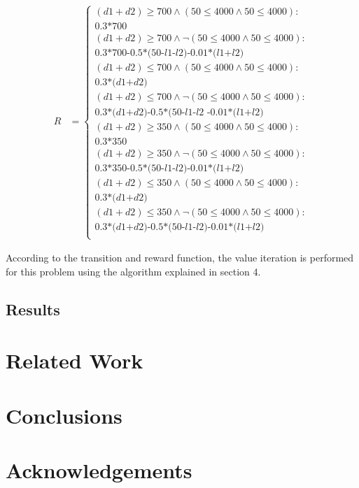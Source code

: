 \documentclass[letterpaper]{article}
\renewcommand{\-}{\text{-}}
\begin{document}
{\footnotesize
\begin{align*}
R & = \begin{cases}
(d1+d2) \geq 700 \wedge (50 \leq 4000 \wedge 50 \leq 4000) :\\
\textit{0.3*700}  \\
(d1+d2) \geq 700 \wedge \neg (50 \leq 4000 \wedge 50 \leq 4000) :\\
\textit{0.3*700-0.5*(50-l1-l2)-0.01*(l1+l2)}  \\
(d1+d2) \leq 700 \wedge (50 \leq 4000 \wedge 50 \leq 4000): \\
\textit{0.3*(d1+d2)} \\
(d1+d2) \leq 700 \wedge \neg (50 \leq 4000 \wedge 50 \leq 4000): \\
\textit{0.3*(d1+d2)-0.5*(50-l1-l2 -0.01*(l1+l2)} \\
(d1+d2) \geq 350 \wedge (50 \leq 4000 \wedge 50 \leq 4000): \\
\textit{0.3*350} \\
(d1+d2) \geq 350 \wedge \neg (50 \leq 4000 \wedge 50 \leq 4000): \\
\textit{0.3*350-0.5*(50-l1-l2)-0.01*(l1+l2)}\\
(d1+d2) \leq 350 \wedge (50 \leq 4000 \wedge 50 \leq 4000): \\
\textit{0.3*(d1+d2)} \\
(d1+d2) \leq 350 \wedge \neg (50 \leq 4000 \wedge 50 \leq 4000): \\
\textit{0.3*(d1+d2)-0.5*(50-l1-l2)-0.01*(l1+l2)}\\
\end{cases}
\end{align*}}

According to the transition and reward function, the value iteration is performed for this problem using the algorithm explained in section 4.


\subsection{Results}



\section{Related Work}



\section{Conclusions}



\section*{Acknowledgements}





\end{document}
